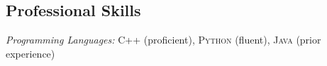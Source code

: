 \documentclass[line,11pt,letter]{includes/cls/myRes}
\begin{document}
\begin{resume}
\section{Professional Skills}
\vspace{-4pt}
\setlength{\parskip}{0pt}
{\sl Programming Languages:} \textsc{C++} (proficient), \textsc{Python} (fluent), \textsc{Java} (prior experience)\\
\vspace*{4pt}
\negspace



%
\end{resume}
\end{document}
